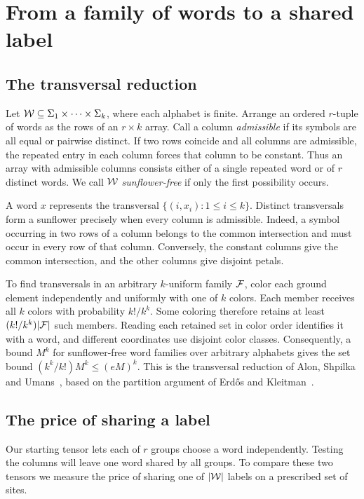 \section{From a family of words to a shared label}\label{sec:words}

\subsection{The transversal reduction}
Let \(\mathcal W\subseteq\Sigma_1\times\cdots\times\Sigma_k\), where each
alphabet is finite. Arrange an ordered \(r\)-tuple of words as the rows
of an \(r\times k\) array. Call a column \emph{admissible} if its symbols
are all equal or pairwise distinct. If two rows coincide and all columns
are admissible, the repeated entry in each column forces that column to
be constant. Thus an array with admissible columns consists either of a
single repeated word or of \(r\) distinct words. We call \(\mathcal W\)
\emph{sunflower-free} if only the first possibility occurs.

A word \(x\) represents the transversal
\(\{(i,x_i):1\le i\le k\}\). Distinct transversals form a sunflower
precisely when every column is admissible. Indeed, a symbol occurring in
two rows of a column belongs to the common intersection and must occur
in every row of that column. Conversely, the constant columns give the
common intersection, and the other columns give disjoint petals.

To find transversals in an arbitrary \(k\)-uniform family \(\mathcal F\), color
each ground element independently and uniformly with one of \(k\) colors.
Each member receives all \(k\) colors with probability \(k!/k^k\).
Some coloring therefore retains at least \((k!/k^k)|\mathcal F|\) such members.
Reading each retained set in color order identifies it with a word, and
different coordinates use disjoint color classes. Consequently, a bound
\(M^k\) for sunflower-free word families over arbitrary alphabets gives
the set bound \((k^k/k!)M^k\le(eM)^k\). This is the transversal
reduction of Alon, Shpilka and Umans~\cite[Theorem~2.6]{ASU}, based
on the partition argument of Erd\H{o}s and Kleitman~\cite{EK}.

\subsection{The price of sharing a label}
Our starting tensor lets each of \(r\) groups choose a word independently.
Testing the columns will leave one word shared by all groups. To compare
these two tensors we measure the price of sharing one of \(|\mathcal W|\)
labels on a prescribed set of sites.

